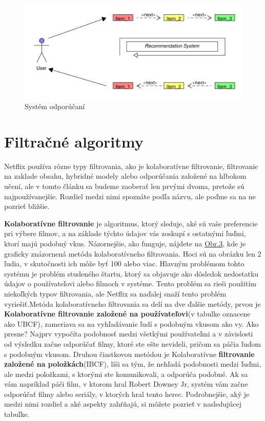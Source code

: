 \documentclass[10pt,slovak,a4paper]{article}
\begin{document}
\begin{figure}[H]
  \centering
  \includegraphics[width=1\textwidth]{Images_tables/RecommendationSystem_pdf.pdf}
  \caption{Systém odporúčaní}
\end{figure}

\section{Filtračné algoritmy}

Netflix používa rôzne typy filtrovania, ako je kolaboratívne filtrovanie, filtrovanie na zaklade obsahu\cite{Filtracne:algoritmy}, hybridné modely alebo odporúčania založené na hlbokom učení, ale v tomto článku sa budeme zaoberať len prvými dvoma, pretože sú najpoužívanejšie. 
Rozdiel medzi nimi spoznáte podľa názvu, ale poďme sa na ne pozrieť bližšie.

\textbf{Kolaboratívne filtrovanie} je algoritmus, ktorý sleduje, aké sú vaše preferencie pri výbere filmov, a na základe týchto údajov vás zoskupí s ostatnými ľuďmi, ktorí majú podobný vkus. Názornejšie, ako funguje, nájdete na \hyperref[Types:of:filtering]{Obr.3}, kde je graficky znázornená metóda kolaboratívneho filtrovania. Hoci sú na obrázku len 2 ľudia, v skutočnosti ich môže byť 100 alebo viac.\cite{Coll:fil} Hlavným problémom tohto systému je problém studeného štartu, ktorý sa objavuje ako dôsledok nedostatku údajov o používateľovi alebo filmoch v systéme. Tento problém sa rieši použitím niekoľkých typov filtrovania, ale Netflix sa naďalej snaží tento problém vyriešiť.Metóda kolaboratívneho filtrovania sa delí na dve ďalšie metódy, prvou je \textbf{Kolaboratívne filtrovanie založené na používateľovi}(v tabulke oznacene ako UBCF), zameriava sa na vyhľadávanie ľudí s podobným vkusom ako vy.\cite{Fil:alg:colab} Ako presne? Najprv vypočíta podobnosť medzi všetkými používateľmi a v závislosti od výsledku začne odporúčať filmy, ktoré ste ešte nevideli, pričom sa páčia ľuďom s podobným vkusom.
Druhou čiastkovou metódou je Kolaboratívne \textbf{filtrovanie založené na položkách}(IBCF), líši sa tým, že nehľadá podobnosti medzi ľuďmi, ale medzi položkami, s ktorými ste komunikovali, a odporúča podobné. Ak sa vám napríklad páči film, v ktorom hral Robert Downey Jr, systém vám začne odporúčať filmy alebo seriály, v ktorých hral tento herec.
Podrobnejšie, aký je medzi nimi rozdiel a aké aspekty zahŕňajú, si môžete pozrieť v nasledujúcej tabuľke.
\end{document}
